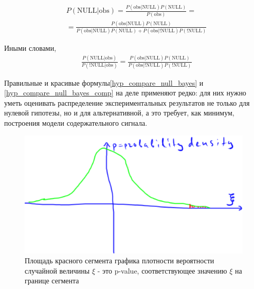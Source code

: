 \documentclass{book}
\begin{document}
\begin{align}\label{hyp_compare_null_bayes}
   &P\left(\text{NULL|obs}\right)=\frac{P\left(\text{obs|NULL}\right) P\left(\text{NULL}\right)}{P\left(\text{obs}\right)} \nonumber =\\
   &=\frac{P\left(\text{obs|NULL}\right) P\left(\text{NULL}\right)}{P\left(\text{obs|NULL}\right) P\left(\text{NULL}\right)+P\left(\text{obs|!NULL}\right) P\left(\text{!NULL}\right)}
\end{align}

Иными словами, 
\begin{align}\label{hyp_compare_null_bayes_comp}
   &\frac{P\left(\text{NULL|obs}\right)}{P\left(\text{!NULL|obs}\right)}=\frac{P\left(\text{obs|NULL}\right) P\left(\text{NULL}\right)}{P\left(\text{obs|!NULL}\right) P\left(\text{!NULL}\right)}
\end{align}

Правильные и красивые формулы\eqref{hyp_compare_null_bayes} и \eqref{hyp_compare_null_bayes_comp} на деле применяют редко: для них нужно уметь оценивать распределение экспериментальных результатов не только для нулевой гипотезы, но и для альтернативной, а это требует, как минимум, построения модели содержательного сигнала. 

\begin{figure}
    \centering
    \includegraphics[scale=.5]{img/p-value.png}
    \caption{Площадь красного сегмента графика плотности вероятности случайной величины $\xi$ - это p-value, соответствующее значению $\xi$ на границе сегмента}
    \label{pval}
\end{figure}



 
\end{document}
